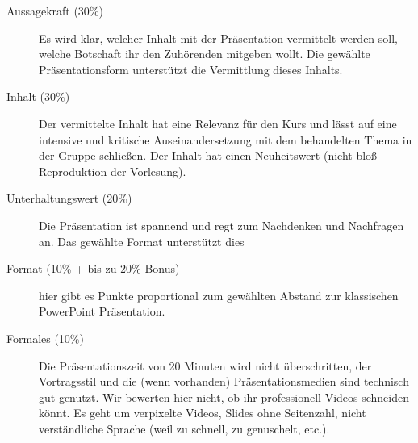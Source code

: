 \documentclass[DIV=15,headinclude=true]{scrreprt}
\begin{document}
\begin{description}
	\item[Aussagekraft (30\%)]
		Es wird klar, welcher Inhalt mit der Präsentation vermittelt werden
		soll, welche Botschaft ihr den Zuhörenden mitgeben wollt. Die gewählte
		Präsentationsform unterstützt die Vermittlung dieses Inhalts.
	\item[Inhalt (30\%)]
		Der vermittelte Inhalt hat eine Relevanz für den Kurs und lässt auf eine
		intensive und kritische Auseinandersetzung mit dem behandelten Thema in
		der Gruppe schließen. Der Inhalt hat einen Neuheitswert (nicht bloß
		Reproduktion der Vorlesung).
	\item[Unterhaltungswert (20\%)]
		Die Präsentation ist spannend und regt zum Nachdenken und Nachfragen an.
		Das gewählte Format unterstützt dies
	\item[Format (10\% + bis zu 20\% Bonus)]
		hier gibt es Punkte proportional zum gewählten Abstand zur klassischen
		PowerPoint Präsentation.
	\item[Formales (10\%)]
		Die Präsentationszeit von 20 Minuten wird nicht überschritten, der
		Vortragsstil und die (wenn vorhanden) Präsentationsmedien sind technisch
		gut genutzt. Wir bewerten hier nicht, ob ihr professionell Videos
		schneiden könnt. Es geht um verpixelte Videos, Slides ohne Seitenzahl,
		nicht verständliche Sprache (weil zu schnell, zu genuschelt, etc.).
\end{description}






\cleardoublepage
{}
\printbibliography
\end{document}
